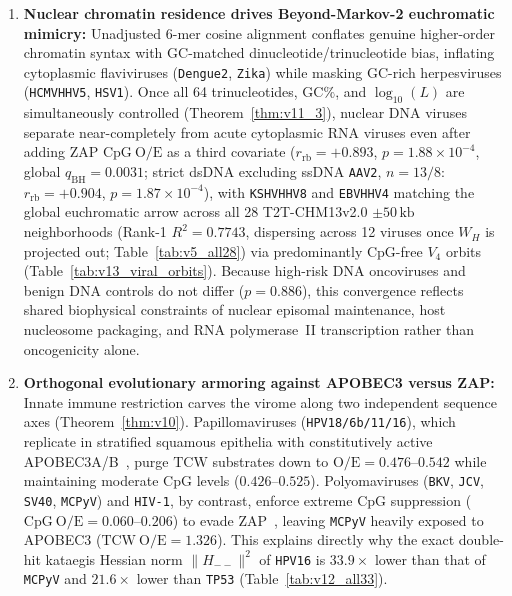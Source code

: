 \documentclass[11pt, a4paper]{article}
\DeclareRobustCommand{\_}{\textunderscore\allowbreak}
\begin{document}
\begin{enumerate}
    \item \textbf{Nuclear chromatin residence drives Beyond-Markov-2 euchromatic mimicry:} Unadjusted 6-mer cosine alignment conflates genuine higher-order chromatin syntax with GC-matched dinucleotide/trinucleotide bias, inflating cytoplasmic flaviviruses (\texttt{Dengue2}, \texttt{Zika}) while masking GC-rich herpesviruses (\texttt{HCMV\_HHV5}, \texttt{HSV1}). Once all 64 trinucleotides, $\mathrm{GC}\%$, and $\log_{10}(L)$ are simultaneously controlled (Theorem~\ref{thm:v11_3}), nuclear DNA viruses separate near-completely from acute cytoplasmic RNA viruses even after adding ZAP $\mathrm{CpG\ O/E}$ as a third covariate ($r_{\mathrm{rb}} = +0.893$, $p = 1.88 \times 10^{-4}$, global $q_{\mathrm{BH}} = 0.0031$; strict dsDNA excluding ssDNA \texttt{AAV2}, $n=13/8$: $r_{\mathrm{rb}} = +0.904$, $p = 1.87 \times 10^{-4}$), with \texttt{KSHV\_HHV8} and \texttt{EBV\_HHV4} matching the global euchromatic arrow across all 28 T2T-CHM13v2.0 $\pm 50\,\mathrm{kb}$ neighborhoods (Rank-1 $R^2 = 0.7743$, dispersing across 12 viruses once $W_H$ is projected out; Table~\ref{tab:v5_all28}) via predominantly CpG-free $V_4$ orbits (Table~\ref{tab:v13_viral_orbits}). Because high-risk DNA oncoviruses and benign DNA controls do not differ ($p = 0.886$), this convergence reflects shared biophysical constraints of nuclear episomal maintenance, host nucleosome packaging, and RNA polymerase~II transcription rather than oncogenicity alone.
    \item \textbf{Orthogonal evolutionary armoring against APOBEC3 versus ZAP:} Innate immune restriction carves the virome along two independent sequence axes (Theorem~\ref{thm:v10}). Papillomaviruses (\texttt{HPV18/6b/11/16}), which replicate in stratified squamous epithelia with constitutively active APOBEC3A/B~\cite{roberts2013,warren2015}, purge $\mathrm{TCW}$ substrates down to $\mathrm{O/E} = 0.476\text{--}0.542$ while maintaining moderate $\mathrm{CpG}$ levels ($0.426\text{--}0.525$). Polyomaviruses (\texttt{BKV}, \texttt{JCV}, \texttt{SV40}, \texttt{MCPyV}) and \texttt{HIV-1}, by contrast, enforce extreme $\mathrm{CpG}$ suppression ($\mathrm{CpG\ O/E} = 0.060\text{--}0.206$) to evade ZAP~\cite{takata2017}, leaving \texttt{MCPyV} heavily exposed to APOBEC3 ($\mathrm{TCW\ O/E} = 1.326$). This explains directly why the exact double-hit kataegis Hessian norm $\|H_{--}\|^2$ of \texttt{HPV16} is $33.9\times$ lower than that of \texttt{MCPyV} and $21.6\times$ lower than \texttt{TP53} (Table~\ref{tab:v12_all33}).

\end{enumerate}
\end{document}
